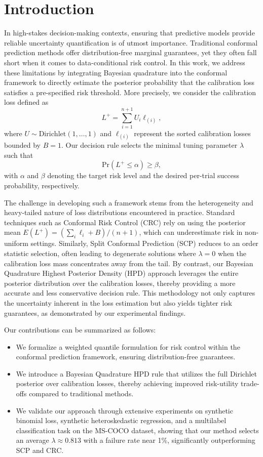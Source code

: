 \documentclass{article}
\begin{document}
\section{Introduction}
In high-stakes decision-making contexts, ensuring that predictive models provide reliable uncertainty quantification is of utmost importance. Traditional conformal prediction methods offer distribution‐free marginal guarantees, yet they often fall short when it comes to data-conditional risk control. In this work, we address these limitations by integrating Bayesian quadrature into the conformal framework to directly estimate the posterior probability that the calibration loss satisfies a pre-specified risk threshold. More precisely, we consider the calibration loss defined as
\[
L^+ = \sum_{i=1}^{n+1} U_i \ell_{(i)},
\]
where \(U \sim \mathrm{Dirichlet}(1,\ldots,1)\) and \(\ell_{(i)}\) represent the sorted calibration losses bounded by \(B=1\). Our decision rule selects the minimal tuning parameter \(\lambda\) such that
\[
\mathrm{Pr}(L^+ \leq \alpha) \geq \beta,
\]
with \(\alpha\) and \(\beta\) denoting the target risk level and the desired per-trial success probability, respectively.

The challenge in developing such a framework stems from the heterogeneity and heavy-tailed nature of loss distributions encountered in practice. Standard techniques such as Conformal Risk Control (CRC) rely on using the posterior mean \(E(L^+)= (\sum_i \ell_i + B)/(n+1)\), which can underestimate risk in non-uniform settings. Similarly, Split Conformal Prediction (SCP) reduces to an order statistic selection, often leading to degenerate solutions where \(\lambda = 0\) when the calibration loss mass concentrates away from the tail. By contrast, our Bayesian Quadrature Highest Posterior Density (HPD) approach leverages the entire posterior distribution over the calibration losses, thereby providing a more accurate and less conservative decision rule. This methodology not only captures the uncertainty inherent in the loss estimation but also yields tighter risk guarantees, as demonstrated by our experimental findings.

Our contributions can be summarized as follows:
\begin{itemize}
    \item We formalize a weighted quantile formulation for risk control within the conformal prediction framework, ensuring distribution-free guarantees.
    \item We introduce a Bayesian Quadrature HPD rule that utilizes the full Dirichlet posterior over calibration losses, thereby achieving improved risk-utility trade-offs compared to traditional methods.
    \item We validate our approach through extensive experiments on synthetic binomial loss, synthetic heteroskedastic regression, and a multilabel classification task on the MS-COCO dataset, showing that our method selects an average \(\lambda \approx 0.813\) with a failure rate near 1\%, significantly outperforming SCP and CRC.
\end{itemize}
\end{document}
